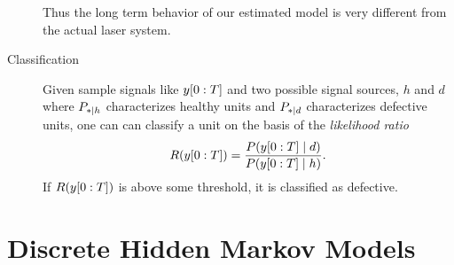 \begin{description}
  Thus the long term behavior of our estimated model is very different
  from the actual laser system.
\item[Classification] Given sample signals like $y[0:T]$ and two
  possible signal sources, $h$ and $d$ where $P_{*\mid h}$
  characterizes healthy units and $P_{*\mid d}$ characterizes defective
  units, one can can classify a unit on the basis of the
  \emph{likelihood ratio}
  \begin{equation*}
    R(y[0:T]) = \frac{P(y[0:T]\mid d)}{P(y[0:T]\mid h)}.
  \end{equation*}
  If $R(y[0:T])$ is above some threshold, it is classified as defective.
\end{description}


\section{Discrete Hidden Markov Models}
\label{sec:intro_hmm}
%


